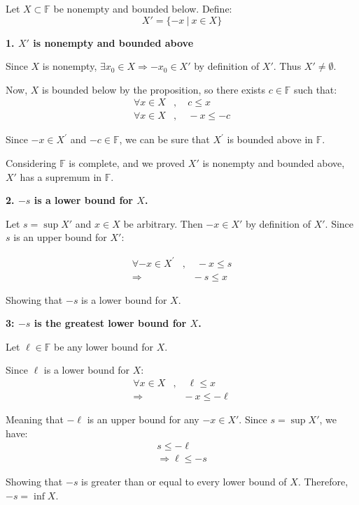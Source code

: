 \begin{bookproof}
Let $X \subset \mathbb{F}$ be nonempty and bounded below. Define:
$$X' = \{-x \ | \ x \in X\}$$

\textbf{1. $X'$ is nonempty and bounded above}

Since $X$ is nonempty, $\exists x_0 \in X \Rightarrow -x_0 \in X'$ by definition of $X'$. Thus $X' \neq \emptyset$.

Now, $X$ is bounded below by the proposition, so there exists $c \in \mathbb{F}$ such that:
\begin{align*}
\forall x \in X&, \quad c \leq x \\
\forall x \in X&, \quad -x \leq -c
\end{align*}

Since $-x \in X^{\prime}$ and $-c \in \mathbb{F}$, we can be sure that $X^{\prime}$ is bounded above in $\mathbb{F}$.

Considering $\mathbb{F}$ is complete, and we proved $X'$ is nonempty and bounded above, $X'$ has a supremum in $\mathbb{F}$.
\vspace{.75cm}

\textbf{2. $-s$ is a lower bound for $X$.}

Let $s = \sup X'$ and $x \in X$ be arbitrary. Then $-x \in X'$ by definition of $X'$. Since $s$ is an upper bound for $X'$:

\begin{align*}
\forall -x \in X^\prime&, \quad -x \leq s \\
\Rightarrow & \quad -s \leq x
\end{align*}

Showing that $-s$ is a lower bound for $X$.
\vspace{.75cm}

\textbf{3: $-s$ is the greatest lower bound for $X$.}

Let $\ell \in \mathbb{F}$ be any lower bound for $X$.

Since $\ell$ is a lower bound for $X$:
\begin{align*}
\forall x \in X&, \quad \ell \leq x\\
\Rightarrow &\quad -x \leq -\ell
\end{align*}

Meaning that $-\ell$ is an upper bound for any $-x \in X'$. Since $s = \sup X'$, we have:
\begin{align*}
s \leq -\ell\\
\Rightarrow \ell \leq -s
\end{align*}

Showing that $-s$ is greater than or equal to every lower bound of $X$. Therefore, $-s = \inf X$.
\end{bookproof}

